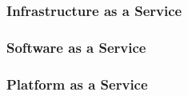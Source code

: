 

\subsubsection{Infrastructure as a Service}

\subsubsection{Software as a Service}

\subsubsection{Platform as a Service}
